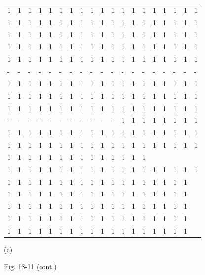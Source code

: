 \documentclass[10pt]{article}
\begin{document}
\begin{center}
\begin{tabular}{|lllllllllllllllllll}
\hline
1 & 1 & 1 & 1 & 1 & 1 & 1 & 1 & 1 & 1 & 1 & 1 & 1 & 1 & 1 & 1 & 1 & 1 & 1 \\
1 & 1 & 1 & 1 & 1 & 1 & 1 & 1 & 1 & 1 & 1 & 1 & 1 & 1 & 1 & 1 & 1 & 1 & 1 \\
1 & 1 & 1 & 1 & 1 & 1 & 1 & 1 & 1 & 1 & 1 & 1 & 1 & 1 & 1 & 1 & 1 & 1 & 1 \\
1 & 1 & 1 & 1 & 1 & 1 & 1 & 1 & 1 & 1 & 1 & 1 & 1 & 1 & 1 & 1 & 1 & 1 & 1 \\
1 & 1 & 1 & 1 & 1 & 1 & 1 & 1 & 1 & 1 & 1 & 1 & 1 & 1 & 1 & 1 & 1 & 1 & 1 \\
- & - & - & - & - & - & - & - & - & - & - & - & - & - & - & - & - & - & - \\
1 & 1 & 1 & 1 & 1 & 1 & 1 & 1 & 1 & 1 & 1 & 1 & 1 & 1 & 1 & 1 & 1 & 1 & 1 \\
1 & 1 & 1 & 1 & 1 & 1 & 1 & 1 & 1 & 1 & 1 & 1 & 1 & 1 & 1 & 1 & 1 & 1 & 1 \\
1 & 1 & 1 & 1 & 1 & 1 & 1 & 1 & 1 & 1 & 1 & 1 & 1 & 1 & 1 & 1 & 1 & 1 & 1 \\
- & - & - & - & - & - & - & - & - & - & - & 1 & 1 & 1 & 1 & 1 & 1 & 1 & 1 \\
1 & 1 & 1 & 1 & 1 & 1 & 1 & 1 & 1 & 1 & 1 & 1 & 1 & 1 & 1 & 1 & 1 & 1 & 1 \\
1 & 1 & 1 & 1 & 1 & 1 & 1 & 1 & 1 & 1 & 1 & 1 & 1 & 1 & 1 & 1 & 1 & 1 & 1 \\
1 & 1 & 1 & 1 & 1 & 1 & 1 & 1 & 1 & 1 & 1 & 1 & 1 & 1 &  &  &  &  &  \\
1 & 1 & 1 & 1 & 1 & 1 & 1 & 1 & 1 & 1 & 1 & 1 & 1 & 1 & 1 & 1 & 1 & 1 & 1 \\
1 & 1 & 1 & 1 & 1 & 1 & 1 & 1 & 1 & 1 & 1 & 1 & 1 & 1 & 1 & 1 & 1 & 1 &  \\
1 & 1 & 1 & 1 & 1 & 1 & 1 & 1 & 1 & 1 & 1 & 1 & 1 & 1 & 1 & 1 & 1 & 1 &  \\
1 & 1 & 1 & 1 & 1 & 1 & 1 & 1 & 1 & 1 & 1 & 1 & 1 & 1 & 1 & 1 & 1 & 1 &  \\
1 & 1 & 1 & 1 & 1 & 1 & 1 & 1 & 1 & 1 & 1 & 1 & 1 & 1 & 1 & 1 & 1 & 1 &  \\
1 & 1 & 1 & 1 & 1 & 1 & 1 & 1 & 1 & 1 & 1 & 1 & 1 & 1 & 1 & 1 & 1 & 1 &  \\
\hline
\end{tabular}
\end{center}

(c)

Fig. 18-11 (cont.)
\end{document}
